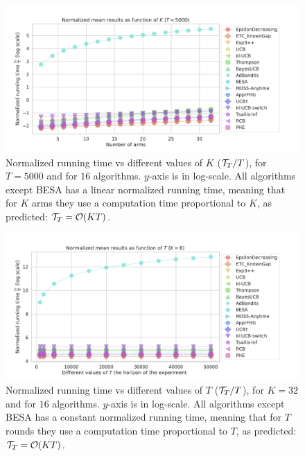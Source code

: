 \begin{figure}[h!]  %
	\includegraphics[width=1.10\linewidth]{16_different_algorithms__lognormtime_vs_arms__16pb__T5000.pdf}
	\caption[Normalized running time vs different values of $K$.]{
        Normalized running time vs different values of $K$ ($\mathcal{T}_T / T$),
        for $T=5000$ and for $16$ algorithms.
        $y$-axis is in log-scale.
        All algorithms except BESA has a linear normalized running time, meaning that for $K$ arms they use a computation time proportional to $K$, as predicted: $\mathcal{T}_T = \mathop{}\mathopen{}\mathcal{O}\mathopen{}\left(KT\right)$.
	}
	\label{fig:3:16_different_algorithms__lognormtime_vs_arms__16pb__T5000}
\end{figure}

\begin{figure}[h!]  %
	\includegraphics[width=1.10\linewidth]{16_different_algorithms__lognormtime_vs_times__16pb__K8.pdf}
	\caption[Normalized running time vs different values of $T$.]{
        Normalized running time vs different values of $T$ ($\mathcal{T}_T / T$),
        for $K=32$ and for $16$ algorithms.
        $y$-axis is in log-scale.
        All algorithms except BESA has a constant normalized running time, meaning that for $T$ rounds they use a computation time proportional to $T$, as predicted: $\mathcal{T}_T = \mathop{}\mathopen{}\mathcal{O}\mathopen{}\left(KT\right)$.
	}
	\label{fig:3:16_different_algorithms__lognormtime_vs_times__16pb__K8}
\end{figure}


